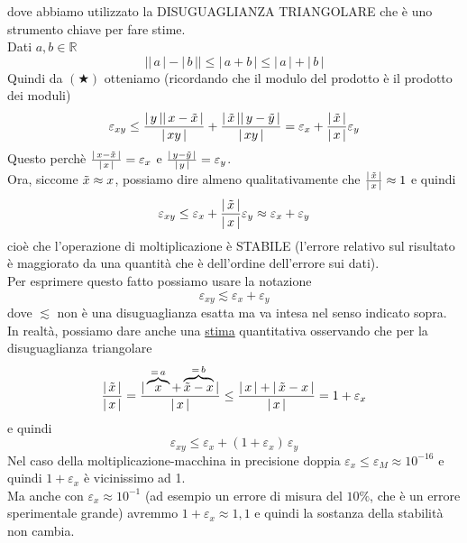 \documentclass[12pt]{article}
\begin{document}
dove abbiamo utilizzato la DISUGUAGLIANZA TRIANGOLARE che è uno strumento chiave per fare stime.\\
Dati $a, b \in \mathbb{R}$
\[ \lvert \lvert \, a \, \rvert - \lvert \, b \, \rvert \rvert \le \lvert \, a + b \, \rvert \le \lvert \, a \, \rvert + \lvert \, b \, \rvert\] 
Quindi da $(\bigstar)$ otteniamo (ricordando che il modulo del prodotto è il prodotto dei moduli)
\[ \varepsilon_{xy} \le \frac{\lvert \,y\, \rvert \lvert \,x - \Tilde{x}\, \rvert}{\lvert \,xy\, \rvert} + \frac{\lvert \,\Tilde{x}\, \rvert \lvert \,y - \Tilde{y}\, \rvert}{\lvert \,xy\, \rvert} = \varepsilon_x + \frac{\lvert \,\Tilde{x}\, \rvert}{\lvert \,x\, \rvert} \varepsilon_y\]
Questo perchè $\frac{\lvert \,x - \Tilde{x}\, \rvert}{\lvert \,x\, \rvert} = \varepsilon_x$ e $\frac{\lvert \,y - \Tilde{y}\, \rvert}{\lvert \,y\, \rvert} = \varepsilon_y$.\\
Ora, siccome $\Tilde{x} \approx x$, possiamo dire almeno qualitativamente che $\frac{\lvert \,\Tilde{x}\, \rvert}{\lvert \,x\, \rvert} \approx 1$ e quindi 
\[ \varepsilon_{xy} \le \varepsilon_x + \frac{\lvert \,\Tilde{x}\, \rvert}{\lvert \,x\, \rvert} \varepsilon_y \approx \varepsilon_x + \varepsilon_y \]
cioè che l’operazione di moltiplicazione è STABILE (l’errore relativo sul risultato è maggiorato da una quantità che è dell'ordine dell'errore sui dati).\\
Per esprimere questo fatto possiamo usare la notazione \[\varepsilon_{xy} \lesssim \varepsilon_x + \varepsilon_y \]
dove $\lesssim$ non è una disuguaglianza esatta ma va intesa nel senso indicato sopra. \\
In realtà, possiamo dare anche una \underline{stima} quantitativa osservando che per la disuguaglianza triangolare 
\[ \frac{\lvert \,\Tilde{x}\, \rvert}{\lvert \,x\, \rvert} = \frac{\lvert \, \overbrace{x}^{=\,a} + \overbrace{\Tilde{x} - x}^{=\,b} \, \rvert}{\lvert\, x \, \rvert} \le \frac{\lvert \, x \, \rvert + \lvert \,\Tilde{x} - x\, \rvert}{\lvert\, x \, \rvert} = 1 + \varepsilon_x\]
e quindi \[ \varepsilon_{xy} \le \varepsilon_x + (1 + \varepsilon_x)\,\varepsilon_y\]
Nel caso della moltiplicazione-macchina in precisione doppia $\varepsilon_x \le \varepsilon_M \approx 10^{-16}$ e quindi $1 + \varepsilon_x$ è vicinissimo ad 1.\\
Ma anche con $\varepsilon_x \approx 10^{-1}$ (ad esempio un errore di misura del $10\%$, che è un errore sperimentale grande) avremmo $1 + \varepsilon_x \approx 1,1$ e quindi la sostanza della stabilità non cambia.\\
\end{document}

